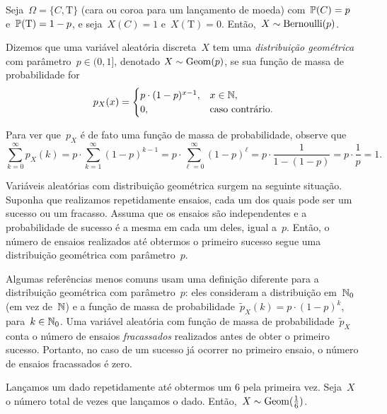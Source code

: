 \begin{example}
Seja~$\Omega = \{C,\text{T}\}$ (cara ou coroa para um lançamento de moeda) com~$\mathbb{P}(C) = p$ e~$\mathbb{P}(\text{T}) = 1-p$, e seja~$X(C) = 1$ e~$X(\text{T}) = 0$. Então,~$X \sim \mathrm{Bernoulli} (p)$.
\end{example}

\begin{definition}
Dizemos que uma variável aleatória discreta~$X$ tem uma
\emph{distribuição geométrica} com parâmetro~$p \in (0,1]$,
denotado
$X \sim \mathrm{Geom} (p)$,
se sua função de massa de probabilidade for
\[
p_X(x) =
\begin{cases}
p \cdot (1-p)^{x-1} ,& x\in\mathbb{N},
\\
0 ,& \text{caso contrário.}
\end{cases}
\]
\end{definition}

Para ver que~$p_X$ é de fato uma função de massa de probabilidade, observe que
\[\sum_{k=0}^\infty p_X(k) = p\cdot \sum_{k=1}^\infty (1-p)^{k-1} =p\cdot \sum_{\ell = 0}^\infty (1-p)^\ell = p\cdot \frac{1}{1-(1-p)}= p \cdot \frac{1}{p} = 1.\]

Variáveis aleatórias com distribuição geométrica surgem na seguinte situação. Suponha que realizamos repetidamente ensaios, cada um dos quais pode ser um sucesso ou um fracasso. Assuma que os ensaios são independentes e a probabilidade de sucesso é a mesma em cada um deles, igual a~$p$. Então, o número de ensaios realizados até obtermos o primeiro sucesso segue uma distribuição geométrica com parâmetro~$p$.

\begin{remark}
Algumas referências menos comuns usam uma definição diferente para a distribuição geométrica com parâmetro~$p$: eles consideram a distribuição em~$\mathbb{N}_0$ (em vez de~$\mathbb{N}$) e a função de massa de probabilidade~$\tilde{p}_X(k) = p\cdot (1-p)^k$, para~$k \in \mathbb{N}_0$. Uma variável aleatória com função de massa de probabilidade~$\tilde{p}_X$ conta o número de ensaios \textit{fracassados} realizados antes de obter o primeiro sucesso. Portanto, no caso de um sucesso já ocorrer no primeiro ensaio, o número de ensaios fracassados é zero.
\end{remark}

\begin{example}
Lançamos um dado repetidamente até obtermos um 6 pela primeira vez. Seja~$X$ o número total de vezes que lançamos o dado. Então,~$X \sim \mathrm{Geom} (\frac16)$.
\end{example}

